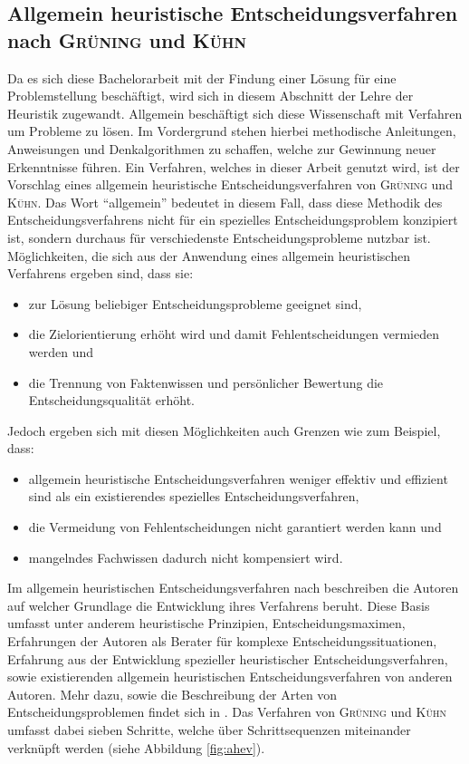 \subsection{Allgemein heuristische Entscheidungsverfahren nach \textsc{Grüning} und \textsc{Kühn}}
Da es sich diese Bachelorarbeit mit der Findung einer Lösung für eine Problemstellung beschäftigt, wird sich in diesem Abschnitt der Lehre der Heuristik zugewandt. Allgemein beschäftigt sich diese Wissenschaft mit Verfahren um Probleme zu lösen. Im Vordergrund stehen hierbei methodische Anleitungen, Anweisungen und Denkalgorithmen zu schaffen, welche zur Gewinnung neuer Erkenntnisse führen. \cite{Duden.10.02.2022} \linebreak Ein Verfahren, welches in dieser Arbeit genutzt wird, ist der Vorschlag eines allgemein heuristische Entscheidungsverfahren von \textsc{Grüning} und \textsc{Kühn}. Das Wort "`allgemein"' bedeutet in diesem Fall, dass diese Methodik des Entscheidungsverfahrens nicht für ein spezielles Entscheidungsproblem konzipiert ist, sondern durchaus für verschiedenste Entscheidungsprobleme nutzbar ist. 
Möglichkeiten, die sich aus der Anwendung eines allgemein heuristischen Verfahrens ergeben sind, dass sie:
\begin{itemize}
	\item zur Lösung beliebiger Entscheidungsprobleme geeignet sind,
	\item die Zielorientierung erhöht wird und damit Fehlentscheidungen vermieden werden und
	\item die Trennung von Faktenwissen und persönlicher Bewertung die Entscheidungsqualität erhöht.
\end{itemize}
Jedoch ergeben sich mit diesen Möglichkeiten auch Grenzen wie zum Beispiel, dass:
\begin{itemize}
	\item allgemein heuristische Entscheidungsverfahren weniger effektiv und effizient sind als ein existierendes spezielles Entscheidungsverfahren,
	\item die Vermeidung von Fehlentscheidungen nicht garantiert werden kann und
	\item mangelndes Fachwissen dadurch nicht kompensiert wird.
\end{itemize}

Im allgemein heuristischen Entscheidungsverfahren nach \cite{Grunig.2013} beschreiben die Autoren auf welcher Grundlage die Entwicklung ihres Verfahrens beruht. Diese Basis umfasst unter anderem heuristische Prinzipien, Entscheidungsmaximen, Erfahrungen der Autoren als Berater für komplexe Entscheidungssituationen, Erfahrung aus der Entwicklung spezieller heuristischer Entscheidungsverfahren, sowie existierenden allgemein heuristischen Entscheidungsverfahren von anderen Autoren. Mehr dazu, sowie die Beschreibung der Arten von Entscheidungsproblemen findet sich in \cite{Grunig.2013}.\linebreak
Das Verfahren von \textsc{Grüning} und \textsc{Kühn} umfasst dabei sieben Schritte, welche über Schrittsequenzen miteinander verknüpft werden (siehe Abbildung \ref{fig:ahev}).  

